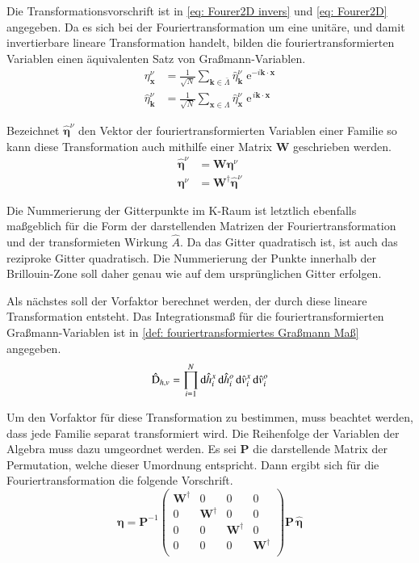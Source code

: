 \noindent Die Transformationsvorschrift ist in \eqref{eq: Fourer2D invers} und \eqref{eq: Fourer2D} angegeben. Da es sich bei der Fouriertransformation um eine unitäre, und damit invertierbare lineare Transformation handelt, bilden die fouriertransformierten Variablen einen äquivalenten Satz von Graßmann-Variablen. 
\begin{align}
\eta_{\bm{x}}^{\nu} &= \frac{1}{\sqrt{N}} \sum_{\bm{k} \in \bar{\Lambda}} \hat{\eta}_{\bm{k}}^{\nu}\; \mathrm{e}^{-i \bm{k} \cdot \bm{x}}  \label{eq: Fourer2D invers}\\
\hat{\eta}_{\bm{k}}^{\nu} &= \frac{1}{\sqrt{N}} \sum_{\bm{x} \in \Lambda} \hat{\eta}_{\bm{x}}^{\nu}\; \mathrm{e}^{\,i \bm{k} \cdot \bm{x}} \label{eq: Fourer2D}
\end{align}

\noindent Bezeichnet $\bm{\hat{\eta}}^{\nu}$ den Vektor der fouriertransformierten Variablen einer Familie so kann diese Transformation auch mithilfe einer Matrix $\bm{W}$ geschrieben werden.
\begin{align}
\bm{\hat{\eta}}^{\nu} &= \bm{W} \bm{\eta} ^{\nu} \\
\bm{\eta}^{\nu} &= \bm{W}^{\dagger} \bm{\hat{\eta}}^{\nu}
\end{align}

\noindent Die Nummerierung der Gitterpunkte im K-Raum ist letztlich ebenfalls maßgeblich für die Form der darstellenden Matrizen der Fouriertransformation und der transformieten Wirkung $\hat{A}$. Da das Gitter quadratisch ist, ist auch das reziproke Gitter quadratisch. Die Nummerierung der Punkte innerhalb der Brillouin-Zone soll daher genau wie auf dem ursprünglichen Gitter erfolgen.

\noindent Als nächstes soll der Vorfaktor berechnet werden, der durch diese lineare Transformation entsteht. Das Integrationsmaß für die fouriertransformierten Graßmann-Variablen ist in \eqref{def: fouriertransformiertes Graßmann Maß} angegeben.
\begin{equation} \label{def: fouriertransformiertes Graßmann Maß}
\hat{\mathrm{D}}_{h,v} = \prod_{i = 1}^N \mathrm{d}\hat{h}_{i}^x\,\mathrm{d}\hat{h}_{i}^o\,\mathrm{d}\hat{v}_{i}^x\,\mathrm{d}\hat{v}_{i}^o
\end{equation}

\noindent Um den Vorfaktor für diese Transformation zu bestimmen, muss beachtet werden, dass jede Familie separat transformiert wird. Die Reihenfolge der Variablen der Algebra muss dazu umgeordnet werden. Es sei $\bm{P}$ die darstellende Matrix der Permutation, welche dieser Umordnung entspricht. Dann ergibt sich für die Fouriertransformation die folgende Vorschrift.
\begin{equation} \label{eq: ft_matrix}
\bm{\eta} = \bm{P}^{-1} \left(\begin{array}{cccc} 
               \bm{W}^{\dagger}  &0&0&0 \\
        0&     \bm{W}^{\dagger}  &0&0 \\
        0&0&   \bm{W}^{\dagger}  &0 \\
        0&0&0& \bm{W}^{\dagger}   \\
    \end{array}\right) 
    \bm{P} \, \bm{\hat{\eta}}
\end{equation}


